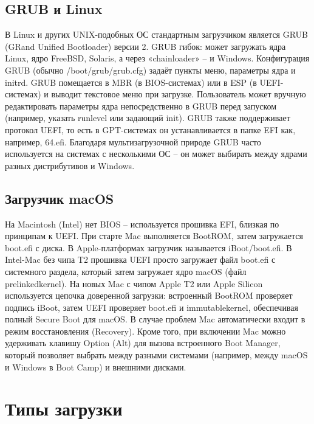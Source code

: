 \hypertarget{grub-ux438-linux}{%
\section{GRUB и Linux}\label{grub-ux438-linux}}

В Linux и других UNIX-подобных ОС стандартным загрузчиком является GRUB
(GRand Unified Bootloader) версии 2. GRUB гибок: может загружать ядра
Linux, ядро FreeBSD, Solaris, а через «chainloader» -- и Windows.
Конфигурация GRUB (обычно /boot/grub/grub.cfg) задаёт пункты меню,
параметры ядра и initrd. GRUB помещается в MBR (в BIOS-системах) или в
ESP (в UEFI-системах) и выводит текстовое меню при загрузке.
Пользователь может вручную редактировать параметры ядра непосредственно
в GRUB перед запуском (например, указать runlevel или задающий init).
GRUB также поддерживает протокол UEFI, то есть в GPT-системах он
устанавливается в папке EFI как, например, \EFI\ubuntu\grubx64.efi.
Благодаря мультизагрузочной природе GRUB часто используется на системах
с несколькими ОС -- он может выбирать между ядрами разных дистрибутивов
и Windows.

\hypertarget{ux437ux430ux433ux440ux443ux437ux447ux438ux43a-macos}{%
\section{Загрузчик
macOS}\label{ux437ux430ux433ux440ux443ux437ux447ux438ux43a-macos}}

На Macintosh (Intel) нет BIOS -- используется прошивка EFI, близкая по
принципам к UEFI. При старте Mac выполняется BootROM, затем загружается
boot.efi с диска. В Apple-платформах загрузчик называется
iBoot/boot.efi. В Intel-Mac без чипа T2 прошивка UEFI просто загружает
файл boot.efi с системного раздела, который затем загружает ядро macOS
(файл prelinkedkernel). На новых Mac с чипом Apple T2 или Apple Silicon
используется цепочка доверенной загрузки: встроенный BootROM проверяет
подпись iBoot, затем UEFI проверяет boot.efi и immutablekernel,
обеспечивая полный Secure Boot для macOS. В случае проблем Mac
автоматически входит в режим восстановления (Recovery). Кроме того, при
включении Mac можно удерживать клавишу Option (Alt) для вызова
встроенного Boot Manager, который позволяет выбрать между разными
системами (например, между macOS и Windows в Boot Camp) и внешними
дисками.

\hypertarget{ux442ux438ux43fux44b-ux437ux430ux433ux440ux443ux437ux43aux438}{%
\chapter{Типы
загрузки}\label{ux442ux438ux43fux44b-ux437ux430ux433ux440ux443ux437ux43aux438}}

